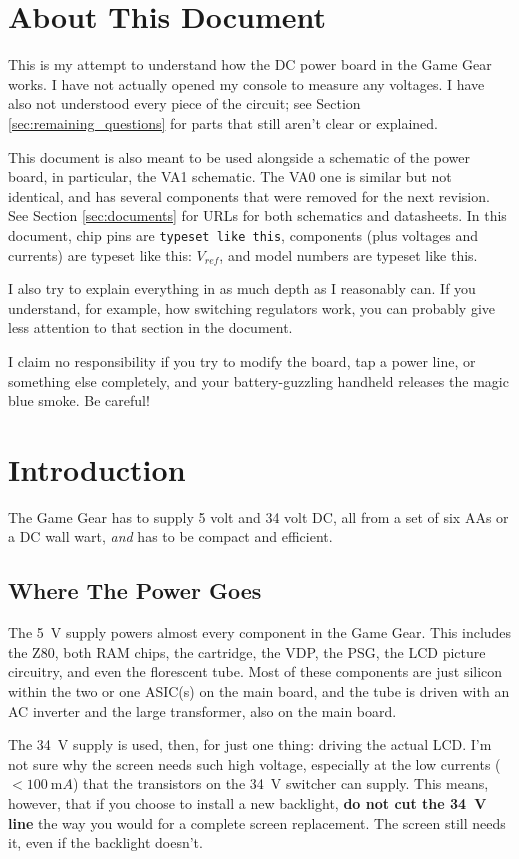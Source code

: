 \documentclass{article}
\newcommand{\Vref}{$V_{ref}$}
\newcommand{\chippin}{\texttt}
\newcommand{\model}{\textsf}
\begin{document}
\section{About This Document}
This is my attempt to understand how the DC power board in the Game
Gear works. I have not actually opened my console to measure any
voltages. I have also not understood every piece of the circuit; see
Section \ref{sec:remaining_questions} for parts that still aren't
clear or explained.

This document is also meant to be used alongside a schematic of the
power board, in particular, the \model{VA1} schematic. The \model{VA0}
one is similar but not identical, and has several components that were
removed for the next revision. See Section \ref{sec:documents} for
URLs for both schematics and datasheets. In this document, chip pins
are \chippin{typeset like this}, components (plus voltages and
currents) are typeset like this: \Vref{}, and model numbers are
\model{typeset like this}.

I also try to explain everything in as much depth as I reasonably
can. If you understand, for example, how switching regulators work,
you can probably give less attention to that section in the document.

I claim no responsibility if you try to modify the board, tap a power
line, or something else completely, and your battery-guzzling handheld
releases the magic blue smoke. Be careful!

\section{Introduction}
The Game Gear has to supply 5 volt and 34 volt DC, all from a set of
six AAs or a DC wall wart, \textit{and} has to be compact and
efficient.

\subsection{Where The Power Goes}
The \qty{5}{\volt} supply powers almost every component in the Game
Gear. This includes the \model{Z80}, both RAM chips, the cartridge, the VDP,
the PSG, the LCD picture circuitry, and even the florescent tube. Most
of these components are just silicon within the two or one ASIC(s) on the
main board, and the tube is driven with an AC inverter and the large
transformer, also on the main board.

The \qty{34}{\volt} supply is used, then, for just one thing: driving
the actual LCD. I'm not sure why the screen needs such high voltage,
especially at the low currents ($<\qty{100}{\milli{}A}$) that the
transistors on the \qty{34}{\volt} switcher can supply. This means,
however, that if you choose to install a new backlight, \textbf{do not
  cut the \qty{34}{\volt} line} the way you would for a complete
screen replacement. The screen still needs it, even if the backlight
doesn't.
\end{document}
